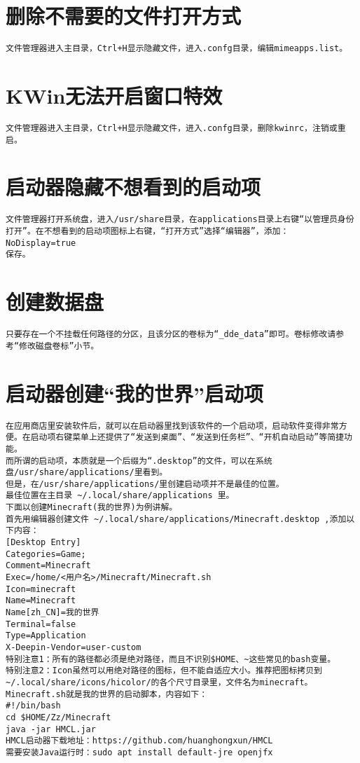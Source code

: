 \documentclass[a4paper,fontset=fandol,zihao=-4,linespread=1.2,oneside]{ctexbook}
\begin{document}
\section{删除不需要的文件打开方式}
\begin{lstlisting}
文件管理器进入主目录，Ctrl+H显示隐藏文件，进入.confg目录，编辑mimeapps.list。
\end{lstlisting}

\section{KWin无法开启窗口特效}
\begin{lstlisting}
文件管理器进入主目录，Ctrl+H显示隐藏文件，进入.confg目录，删除kwinrc，注销或重启。
\end{lstlisting}

\section{启动器隐藏不想看到的启动项}
\begin{lstlisting}
文件管理器打开系统盘，进入/usr/share目录，在applications目录上右键“以管理员身份打开”。在不想看到的启动项图标上右键，“打开方式”选择“编辑器”，添加：NoDisplay=true
保存。
\end{lstlisting}

\section{创建数据盘}
\begin{lstlisting}
只要存在一个不挂载任何路径的分区，且该分区的卷标为“_dde_data”即可。卷标修改请参考“修改磁盘卷标”小节。
\end{lstlisting}

\section{启动器创建“我的世界”启动项}
\begin{lstlisting}
在应用商店里安装软件后，就可以在启动器里找到该软件的一个启动项，启动软件变得非常方便。在启动项右键菜单上还提供了“发送到桌面”、“发送到任务栏”、“开机自动启动”等简捷功能。
而所谓的启动项，本质就是一个后缀为“.desktop”的文件，可以在系统盘/usr/share/applications/里看到。
但是，在/usr/share/applications/里创建启动项并不是最佳的位置。
最佳位置在主目录 ~/.local/share/applications 里。
下面以创建Minecraft(我的世界)为例讲解。
首先用编辑器创建文件 ~/.local/share/applications/Minecraft.desktop ,添加以下内容：
[Desktop Entry]
Categories=Game;
Comment=Minecraft
Exec=/home/<用户名>/Minecraft/Minecraft.sh
Icon=minecraft
Name=Minecraft
Name[zh_CN]=我的世界
Terminal=false
Type=Application
X-Deepin-Vendor=user-custom
特别注意1：所有的路径都必须是绝对路径，而且不识别$HOME、~这些常见的bash变量。
特别注意2：Icon虽然可以用绝对路径的图标，但不能自适应大小。推荐把图标拷贝到~/.local/share/icons/hicolor/的各个尺寸目录里，文件名为minecraft。
Minecraft.sh就是我的世界的启动脚本，内容如下：
#!/bin/bash
cd $HOME/Zz/Minecraft
java -jar HMCL.jar
HMCL启动器下载地址：https://github.com/huanghongxun/HMCL
需要安装Java运行时：sudo apt install default-jre openjfx
\end{lstlisting}
\end{document}
